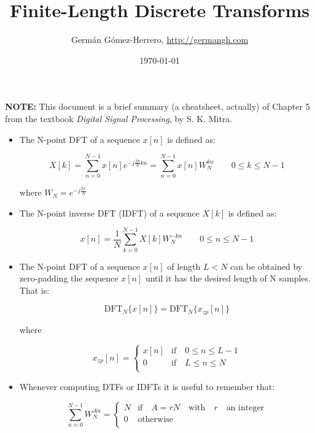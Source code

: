 \documentclass[a4paper,11pt,oneside]{article}
\title{Finite-Length Discrete Transforms}
\date{\today}
\author{Germ\'an G\'omez-Herrero, \url{http://germangh.com}}
\begin{document}
\maketitle

\textbf{NOTE:} This document is a brief summary (a cheatsheet, actually) of Chapter 5 from the textbook \emph{Digital Signal Processing}, by S. K. Mitra. 



\begin{itemize}
\item The N-point DFT of a sequence $x[n]$ is defined as:

\begin{equation} \label{DFT}
X[k] = \sum_{n=0}^{N-1}x[n]e^{-j\frac{2\pi}{N}kn}=\sum_{n=0}^{N-1}x[n]W_{N}^{kn} \qquad 0\leq k \leq N-1
\end{equation}

where $W_{N}=e^{-j\frac{2\pi}{N}}$

\item The N-point inverse DFT (IDFT) of a sequence $X[k]$ is defined as:


\begin{equation} \label{IDFT}
x[n] = \frac{1}{N}\sum_{k=0}^{N-1}X[k]W_{N}^{-kn} \qquad 0\leq n \leq N-1
\end{equation}

\item The N-point DFT of a sequence $x[n]$ of length $L<N$ can be obtained by zero-padding the sequence $x[n]$ until it has the desired length of N samples. That is:

\[
\textrm{DFT}_{N}\{x[n]\}=\textrm{DFT}_{N}\{x_{zp}[n]\}
\]

where

\[
x_{zp}[n]=\left\{
\begin{array}{ll}
x[n] & \textrm{if} \quad 0 \leq n \leq L-1\\
0 & \textrm{if} \quad L \leq n \leq N\\ 
\end{array}
\right.
\]

\item Whenever computing DTFs or IDFTs it is useful to remember that:

\begin{equation}
\sum_{n=0}^{N-1}W_{N}^{An}=\left\{
\begin{array}{ll}
N & \textrm{if} \quad A = rN \quad \textrm{with} \quad r \quad \textrm{an integer}\\
0 & \textrm{otherwise}\\
\end{array}
\right.
\end{equation}



\end{itemize}
\end{document}
